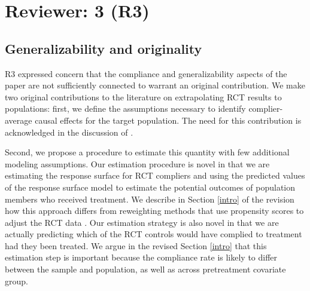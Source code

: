 \documentclass[hidelinks,12pt,letterpaper]{article}
\begin{document}
\section{Reviewer: 3 (R3)}

\subsection{Generalizability and originality}


R3 expressed concern that the compliance and generalizability aspects of the paper are not sufficiently connected to warrant an original contribution. We make two original contributions to the literature on extrapolating RCT results to populations: first, we define the assumptions necessary to identify complier-average causal effects for the target population. The need for this contribution is acknowledged in the discussion of \citet{Hartman}. 

Second, we propose a procedure to estimate this quantity with few additional modeling assumptions. Our estimation procedure is novel in that we are estimating the response surface for RCT compliers and using the predicted values of the response surface model to estimate the potential outcomes of population members who received treatment. We describe in Section \ref{intro} of the revision how this approach differs from reweighting methods that use propensity scores to adjust the RCT data \citep[e.g.,][]{stuart2011use}. Our estimation strategy is also novel in that we are actually predicting which of the RCT controls would have complied to treatment had they been treated. We argue in the revised Section \ref{intro} that this estimation step is important because the compliance rate is likely to differ between the sample and population, as well as across pretreatment covariate group. 
\end{document}

